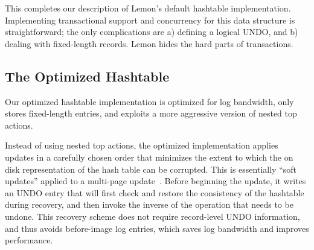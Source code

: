 \documentclass[10pt,letterpaper,twocolumn,english]{article}
\newcommand{\yad}{Lemon\xspace}
\newcommand{\eab}[1]{\textcolor{red}{\bf EAB: #1}}
\begin{document}

This completes our description of \yad's default hashtable
implementation.  Implementing
transactional support and concurrency for this data structure is
straightforward; the only complications are a) defining a logical
UNDO, and b) dealing with fixed-length records. \yad hides the hard parts of transactions.




\subsection{The Optimized Hashtable}

Our optimized hashtable implementation is optimized for log bandwidth,
only stores fixed-length entries, and exploits a more aggressive
version of nested top actions.

Instead of using nested top actions, the optimized implementation
applies updates in a carefully chosen order that minimizes the extent
to which the on disk representation of the hash table can be corrupted. 
This is essentially ``soft updates''
applied to a multi-page update~\cite{soft-updates}.  Before beginning
the update, it writes an UNDO entry that will first check and restore the
consistency of the hashtable during recovery, and then invoke the
inverse of the operation that needs to be undone.  This recovery
scheme does not require record-level UNDO information, and thus avoids
before-image log entries, which saves log bandwidth and improves
performance.
\end{document}
